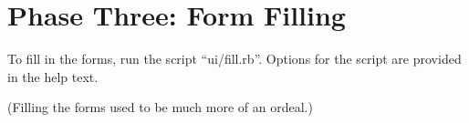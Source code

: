 \section{Phase Three: Form Filling}

To fill in the forms, run the script ``ui/fill.rb''. Options for the script are
provided in the help text.

(Filling the forms used to be much more of an ordeal.)



